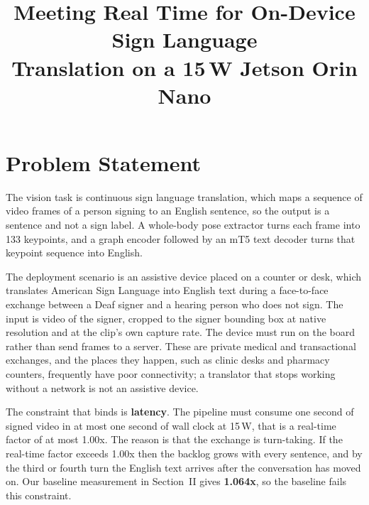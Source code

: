 \documentclass[conference]{IEEEtran}
\begin{document}
\title{Meeting Real Time for On-Device Sign Language\\Translation on a 15\,W Jetson Orin Nano}

\author{
\and
{}
}

\maketitle

\section{Problem Statement}

The vision task is continuous sign language translation, which maps a sequence of
video frames of a person signing to an English sentence, so the output is a sentence
and not a sign label. A whole-body pose extractor turns each frame into 133 keypoints,
and a graph encoder followed by an mT5 text decoder turns that keypoint sequence into
English.

The deployment scenario is an assistive device placed on a counter or desk, which
translates American Sign Language into English text during a face-to-face exchange
between a Deaf signer and a hearing person who does not sign. The input is video of
the signer, cropped to the signer bounding box at native resolution and at the clip's
own capture rate. The device must run on the board rather than send frames to a
server. These are private medical and transactional exchanges, and the places they
happen, such as clinic desks and pharmacy counters, frequently have poor connectivity;
a translator that stops working without a network is not an assistive device.

The constraint that binds is \textbf{latency}. The pipeline must consume one second of
signed video in at most one second of wall clock at 15\,W, that is a real-time factor
of at most 1.00x. The reason is that the exchange is turn-taking. If the real-time
factor exceeds 1.00x then the backlog grows with every sentence, and by the third or
fourth turn the English text arrives after the conversation has moved on. Our baseline
measurement in Section~II gives \textbf{1.064x}, so the baseline fails this
constraint.
\end{document}
